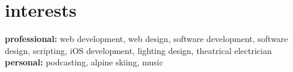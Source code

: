 \documentclass[]{cv-style} %
\begin{document}

%
%
%
%
%


\section{interests}

\textbf{professional:} web development, web design, software development, software design, scripting, iOS development, lighting design, theatrical electrician \textbf{personal:} podcasting, alpine skiing, music
\end{document}
